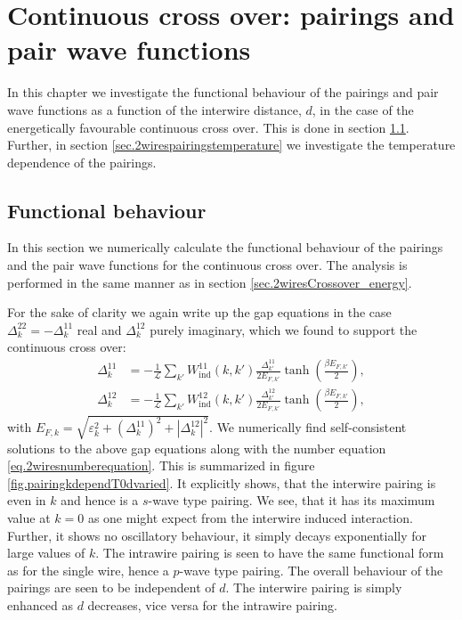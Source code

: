 
\chapter{Continuous cross over: pairings and pair wave functions} %

\label{Chapter11} %

In this chapter we investigate the functional behaviour of the pairings and pair wave functions as a function of the interwire distance, $d$, in the case of the energetically favourable continuous cross over. This is done in section \ref{sec.2wirespairingspairwavefunction}. Further, in section \ref{sec.2wirespairingstemperature} we investigate the temperature dependence of the pairings. 

\section{Functional behaviour} \label{sec.2wirespairingspairwavefunction}
In this section we numerically calculate the functional behaviour of the pairings and the pair wave functions for the continuous cross over. The analysis is performed in the same manner as in section \ref{sec.2wiresCrossover_energy}. 

For the sake of clarity we again write up the gap equations in the case $\Delta^{22}_k = - \Delta^{11}_k$ real and $\Delta^{12}_k$ purely imaginary, which we found to support the continuous cross over:
\begin{align}
\Delta^{11}_k &= -\frac{1}{\mathcal{L}}\sum_{k'} W_{\text{ind}}^{11}(k, k')\frac{\Delta^{11}_{k'}}{2E_{F,k'}}\tanh\left(\frac{\beta E_{F,k'}}{2}\right), \nonumber \\
\Delta^{12}_k &= -\frac{1}{\mathcal{L}}\sum_{k'} W_{\text{ind}}^{12}(k, k')\frac{\Delta^{12}_{k'}}{2E_{F,k'}}\tanh\left(\frac{\beta E_{F,k'}}{2}\right), \nonumber
\end{align} 
with $E_{F,k} = \sqrt{\varepsilon^2_k + (\Delta^{11}_k)^2 + |\Delta^{12}_k|^2}$. We numerically find self-consistent solutions to the above gap equations along with the number equation \eqref{eq.2wiresnumberequation}. This is summarized in figure \ref{fig.pairingkdependT0dvaried}. It explicitly shows, that the interwire pairing is even in $k$ and hence is a $s$-wave type pairing. We see, that it has its maximum value at $k = 0$ as one might expect from the interwire induced interaction. Further, it shows no oscillatory behaviour, it simply decays exponentially for large values of $k$. The intrawire pairing is seen to have the same functional form as for the single wire, hence a $p$-wave type pairing. The overall behaviour of the pairings are seen to be independent of $d$. The interwire pairing is simply enhanced as $d$ decreases, vice versa for the intrawire pairing.  

